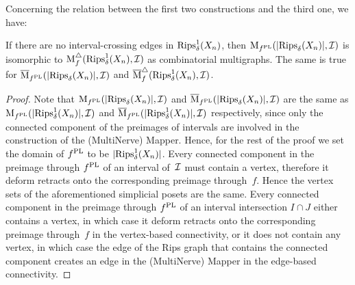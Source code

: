 Concerning the relation between the first two constructions and the third one, we have:
%
\begin{lem}\label{lem:cons_equ2}
If there are no interval-crossing edges in $\mathrm{Rips}^1_\delta(X_n)$, then
$\mathrm{M}_{f^{\rm PL}}(|\mathrm{Rips}_\delta(X_n)|, \mathcal{I})$ is isomorphic to 
${\rm M}^\triangle_f(\mathrm{Rips}^1_\delta(X_n), \mathcal{I})$ as combinatorial multigraphs.
The same is true for $\overline{\mathrm{M}}_{f^{\rm PL}}(|\mathrm{Rips}_\delta(X_n)|, \mathcal{I})$ 
and $\overline{\rm M}^\triangle_f(\mathrm{Rips}^1_\delta(X_n), \mathcal{I})$.
\end{lem}
%
\begin{proof}
Note that $\mathrm{M}_{f^{\rm PL}}(|\mathrm{Rips}_\delta(X_n)|, \mathcal{I})$ and
$\overline{\mathrm{M}}_{f^{\rm PL}}(|\mathrm{Rips}_\delta(X_n)|, \mathcal{I})$ are the same as
$\mathrm{M}_{f^{\rm PL}}(|\mathrm{Rips}^1_\delta(X_n)|, \mathcal{I})$ and 
$\overline{\mathrm{M}}_{f^{\rm PL}}(|\mathrm{Rips}^1_\delta(X_n)|, \mathcal{I})$ respectively, since only the connected component of the
preimages of intervals are involved in the construction of the
(MultiNerve) Mapper. Hence, for the rest of the proof we set the
domain of $f^{\rm PL}$ to be $|\mathrm{Rips}^1_\delta(X_n)|$.  Every
connected component in the preimage through $f^{\rm PL}$ of an interval of~$\mathcal{I}$ must
contain a vertex, therefore it deform retracts onto the
corresponding preimage through~$f$. Hence the vertex sets of the
aforementioned simplicial posets are the same.
Every connected component in the preimage through $f^{\rm PL}$ of an interval
intersection $I\cap J$ either contains a vertex, in which case it
deform retracts onto the corresponding preimage through~$f$ in
the vertex-based connectivity, or it does not contain any vertex, in
which case the edge of the Rips graph that contains the connected component creates an
edge in the (MultiNerve) Mapper in the edge-based connectivity.
\end{proof}

